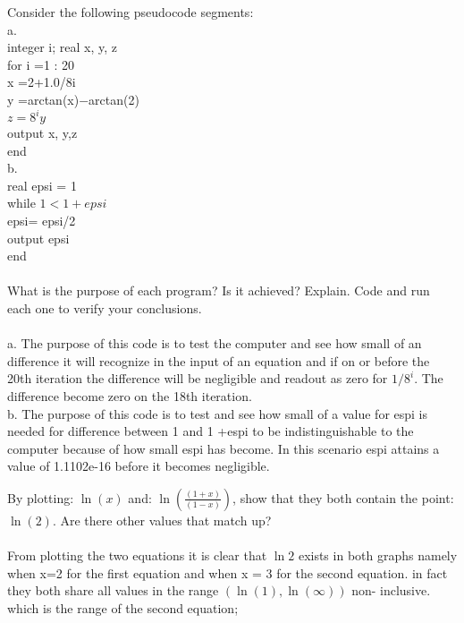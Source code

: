 \documentclass[12pt]{article}
\newenvironment{problem}[2][Problem]{\begin{trivlist}
\item[\hskip \labelsep {\bfseries #1}\hskip \labelsep {\bfseries #2.}]}{\end{trivlist}}
\begin{document}
\begin{problem}{19}
Consider the following pseudocode segments:\\ a.\\
 integer i; 
 real x, y, z\\ for i =1 : 20\\
  x =2+1.0/8i \\
  y =arctan(x)−arctan(2)\\
   $z = 8^i y$\\
    output x, y,z \\
    end \\
    b.\\
     real epsi = 1\\
      while $1 < 1+epsi$ \\
      epsi= epsi/2 \\
      output epsi\\
 end\\
      \text{ }\\
       What is the purpose of each program? Is it achieved? Explain. Code and run each one to verify your conclusions. \\
    \text{ }\\
    a. The purpose of this code is to test the computer and see how small of an difference it will recognize in the input of an equation and if on or before the 20th iteration the difference will be negligible and readout as zero for $1/8^i$. The difference become zero on the 18th iteration.\\
    b. The purpose of this code is to test and see how small of a value for espi is needed for difference between 1 and 1 +espi to be  indistinguishable to the computer because of how small espi has become. In this scenario espi attains a value of 1.1102e-16 before it becomes negligible.
    


\end{problem}


\begin{problem}{30}
By plotting: $\ln\left(x\right)$ and: $\ln\left(\frac{\left(1+x\right)}{\left(1-x\right)}\right)$, show that they both contain the point: $\ln\left(2\right)$. Are there other values that match up?\\
\text{ }\\
From plotting the two equations it is clear that $\ln 2$ exists in both graphs namely when x=2 for the first equation and when x = 3 for the second equation. in fact they both share all values in the range $(\ln (1), \ln (\infty) )$ non- inclusive. which is the range of the second equation;



\end{problem}
\end{document}
